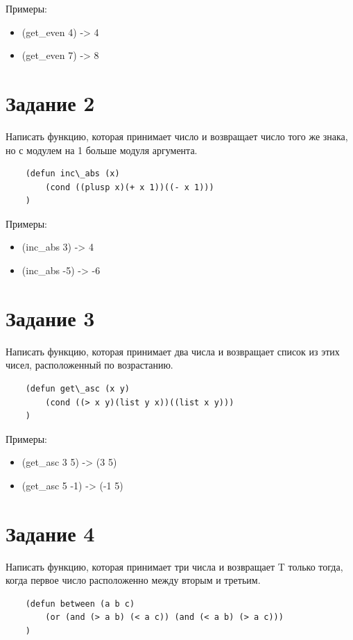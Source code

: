 \documentclass[a4paper, 12pt]{article}
\begin{document}
Примеры:
\begin{itemize}
	\item (get\_even 4) -> 4
	\item (get\_even 7) -> 8\\
\end{itemize}

\section*{Задание 2}
Написать функцию, которая принимает число и возвращает число того же знака, но с модулем на 1 больше модуля аргумента.\\
\begin{lstlisting}
	(defun inc\_abs (x) 
		(cond ((plusp x)(+ x 1))((- x 1)))
	)
\end{lstlisting}

Примеры:
\begin{itemize}
	\item (inc\_abs 3) -> 4
	\item (inc\_abs -5) -> -6\\
\end{itemize}

\section*{Задание 3}
Написать функцию, которая принимает два числа и возвращает список из этих чисел, расположенный по возрастанию.\\
\begin{lstlisting}
	(defun get\_asc (x y) 
		(cond ((> x y)(list y x))((list x y)))
	)
\end{lstlisting}

Примеры:
\begin{itemize}
	\item (get\_asc 3 5) -> (3 5)
	\item (get\_asc 5 -1) -> (-1 5)\\
\end{itemize}

\section*{Задание 4}
Написать функцию, которая принимает три числа и возвращает T только тогда, когда первое число расположенно между вторым и третьим.\\
\begin{lstlisting}
	(defun between (a b c) 
		(or (and (> a b) (< a c)) (and (< a b) (> a c)))
	)
\end{lstlisting}
\end{document}

